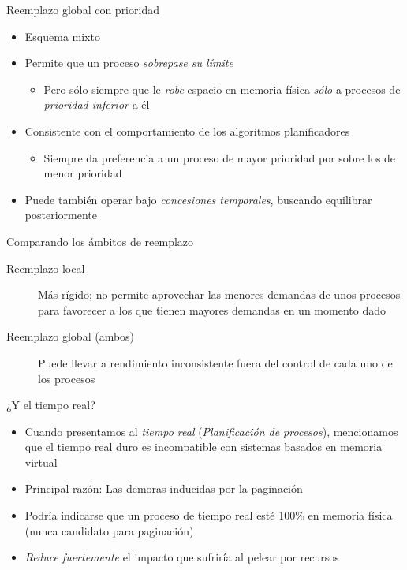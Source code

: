 \documentclass[presentation]{beamer}
\newcommand{\rarrow}{$\rightarrow$\hskip 0.5em}
\begin{document}
\begin{frame}[label={sec:org9d943bc}]{Reemplazo global con prioridad}
\begin{itemize}
\item Esquema mixto
\item Permite que un proceso \emph{sobrepase su límite}
\begin{itemize}
\item Pero sólo siempre que le \emph{robe} espacio en memoria física \emph{sólo}
a procesos de \emph{prioridad inferior} a él
\end{itemize}
\item Consistente con el comportamiento de los algoritmos planificadores
\begin{itemize}
\item Siempre da preferencia a un proceso de mayor prioridad por sobre
los de menor prioridad
\end{itemize}
\item Puede también operar bajo \emph{concesiones temporales}, buscando
equilibrar posteriormente
\end{itemize}
\end{frame}

\begin{frame}[label={sec:org38cc5da}]{Comparando los ámbitos de reemplazo}
\begin{description}
\item[{Reemplazo local}] Más rígido; no permite aprovechar las menores
demandas de unos procesos para favorecer a los que tienen
mayores demandas en un momento dado
\item[{Reemplazo global (ambos)}] Puede llevar a rendimiento
inconsistente fuera del control de cada uno de los procesos
\end{description}
\end{frame}

\begin{frame}[label={sec:org487bd05}]{¿Y el tiempo real?}
\begin{itemize}
\item Cuando presentamos al \emph{tiempo real} (\emph{Planificación de procesos}),
mencionamos que el tiempo real duro es incompatible con sistemas
basados en memoria virtual
\item Principal razón: Las demoras inducidas por la paginación
\item Podría indicarse que un proceso de tiempo real esté 100\% en memoria
física (nunca candidato para paginación)
\item \emph{Reduce fuertemente} el impacto que sufriría al pelear por recursos
\end{itemize}
\end{frame}
\end{document}
